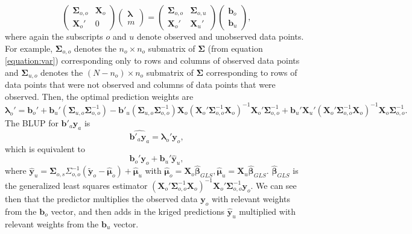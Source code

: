 \documentclass[]{interact}
\theoremstyle{plain}%
\theoremstyle{definition}
\theoremstyle{remark}
\begin{document}
\begin{equation}
\begin{pmatrix}
\bm{\Sigma}_{o, o} & \mathbf{X}_o \\
\mathbf{X}_o' & 0
\end{pmatrix} 
\begin{pmatrix}
\bm{\lambda} \\
m
\end{pmatrix} = 
\begin{pmatrix}
\bm{\Sigma}_{o, o} & \bm{\Sigma}_{o, u} \\
\mathbf{X}_{o}' & \mathbf{X}_{u}'
\end{pmatrix} 
\begin{pmatrix}
\mathbf{b}_{o} \\
\mathbf{b}_{u}
\end{pmatrix},
\end{equation} \noindent where again the subscripts \(o\) and \(u\)
denote observed and unobserved data points. For example,
\(\bm{\Sigma}_{o, o}\) denotes the \(n_o \times n_o\) submatrix of
\(\bm{\Sigma}\) (from equation \ref{equation:var}) corresponding only to
rows and columns of observed data points and \(\bm{\Sigma}_{u, o}\)
denotes the \((N - n_o) \times n_o\) submatrix of \(\bm{\Sigma}\)
corresponding to rows of data points that were not observed and columns
of data points that were observed. Then, the optimal prediction weights
are \mbox{} \begin{equation}
\bm{\lambda}_o' = \mathbf{b}_{o}' + \mathbf{b}_{u}' (\bm{\Sigma}_{u, o}\bm{\Sigma}_{o, o}^{-1}) - \mathbf{b}'_{u}(\bm{\Sigma}_{u, o} \bm{\Sigma}_{o, o}^{-1})\mathbf{X}_o(\mathbf{X}_o'\bm{\Sigma}_{o, o}^{-1}\mathbf{X}_o)^{-1}\mathbf{X}_o'\bm{\Sigma}_{o, o}^{-1} + \mathbf{b}_{u}' \mathbf{X}_{u}'(\mathbf{X}_o'\bm{\Sigma}_{o, o}^{-1}\mathbf{X}_o)^{-1}\mathbf{X}_o \bm{\Sigma}_{o, o}^{-1}.
\end{equation} \noindent The BLUP for \(\mathbf{b}'_a \mathbf{y}_a\) is
\mbox{} \begin{equation} \label{equation:blup}
\widehat{\mathbf{b}'_a \mathbf{y}_a} = \bm{\lambda}_o' \mathbf{y}_o,
\end{equation} \noindent which is equivalent to \mbox{}
\begin{equation*}
\mathbf{b}_{o}'\mathbf{y}_{o} + \mathbf{b}_{u}' \mathbf{\hat{y}}_{u},
\end{equation*} \noindent where
\(\mathbf{\hat{y}}_{u} = \bm{\Sigma}_{o, s} \Sigma_{o, o}^{-1} (\mathbf{\tilde{y}}_o - \bm{\hat{\mu}}_o) + \bm{\hat{\mu}}_u\)
with
\(\bm{\hat{\mu}}_o = \mathbf{X}_o \bm{\hat{\beta}}_{GLS}, \bm{\hat{\mu}}_u = \mathbf{X}_u \bm{\hat{\beta}}_{GLS}\).
\(\bm{\hat{\beta}}_{GLS}\) is the generalized least squares estimator
\((\mathbf{X}_o' \bm{\Sigma}_{o, o}^{-1} \mathbf{X}_o)^{-1} \mathbf{X}_o' \bm{\Sigma}_{o, o}^{-1} \mathbf{y}_o\).
We can see then that the predictor multiplies the observed data
\(\mathbf{y}_o\) with relevant weights from the \(\mathbf{b}_o\) vector,
and then adds in the kriged predictions \(\mathbf{\hat{y}}_{u}\)
multiplied with relevant weights from the \(\mathbf{b}_u\) vector.
\end{document}

